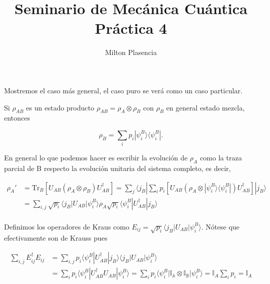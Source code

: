 \documentclass[12pt]{article}
\title{\textbf{Seminario de Mecánica Cuántica}\\[0.3cm] \large Práctica 4}
\date{}
\author{Milton Plasencia}
\makeatletter
\theoremstyle{definition}\@ifundefined{exercise}{\newtheorem{exercise}{Ejercicio}}{}%
\makeatother
\begin{document}
\maketitle
\thispagestyle{fancy}


\begin{exercise}
Mostremos el caso más general, el caso puro se verá como un caso particular.

Si $\rho_{AB}$ es un estado producto $\rho_{AB}=\rho_A \otimes \rho_B$ con $\rho_B$ en general estado mezcla, entonces

\begin{equation*}
     \rho_B=\sum_i p_i |\psi^B_i\rangle\langle\psi^B_i|.
\end{equation*}

En general lo que podemos hacer es escribir la evolución de $\rho_{A}$ como la traza parcial de B respecto la evolución unitaria del sistema completo, es decir,

\begin{align*}
    \rho_A' &= \text{Tr}_B\left[U_{AB}(\rho_A \otimes \rho_B)U_{AB}^{\dagger}\right] = \sum_j \langle j_B| \sum_i p_i \left[U_{AB}(\rho_A \otimes |\psi^B_i\rangle\langle\psi^B_i|)U_{AB}^{\dagger}\right]|j_B\rangle \\
    &= \sum_{i,j} \sqrt{p_i} \langle j_B|U_{AB}|\psi^B_i\rangle \rho_A \sqrt{p_i}  \langle\psi^B_i|U_{AB}^{\dagger}|j_B\rangle \\
\end{align*}

Definimos los operadores de Kraus como $E_{ij} = \sqrt{p_i} \langle j_B|U_{AB}|\psi^B_i\rangle$. Nótese que efectivamente son de Krauss pues

\begin{align*}
    \sum_{i,j} E_{ij}^{\dagger}E_{ij} &= \sum_{i,j} p_i \langle\psi^B_i|U_{AB}^{\dagger}|j_B\rangle \langle j_B|U_{AB}|\psi^B_i\rangle \\
    &= \sum_i p_i \langle\psi^B_i|U_{AB}^{\dagger}U_{AB}|\psi^B_i\rangle = \sum_i p_i \langle\psi^B_i|\mathbb{I_A}\otimes \mathbb{I_B}|\psi^B_i\rangle = \mathbb{I}_A \sum_i p_i = \mathbb{I}_A
\end{align*}

\end{exercise}
\end{document}
